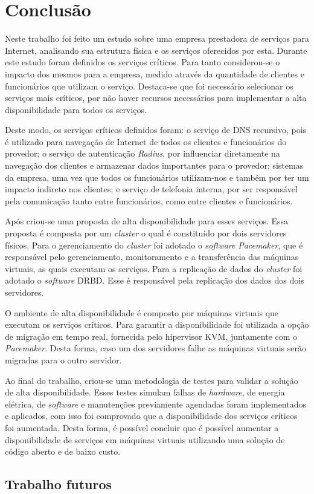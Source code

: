 \chapter{Conclusão}
\label{cap:conclusao}

Neste trabalho foi feito um estudo sobre uma empresa prestadora de serviços para Internet, analisando sua estrutura física e os serviços oferecidos 
por esta. Durante este estudo foram definidos os serviços críticos. Para tanto considerou-se o impacto dos mesmos para a empresa, medido através
da quantidade de clientes e funcionários que utilizam o serviço. Destaca-se que foi necessário selecionar os serviços mais críticos, por não 
haver recursos necessários para implementar a alta disponibilidade para todos os serviços.

Deste modo, os serviços críticos definidos foram: o serviço de \ac{DNS} recursivo, pois é utilizado para navegação de Internet de todos os clientes 
e funcionários do provedor; o serviço de autenticação \textit{Radius}, por influenciar diretamente na navegação dos clientes e armazenar dados 
importantes para o provedor; sistemas da empresa, uma vez que todos os funcionários utilizam-nos e também por ter um impacto indireto nos 
clientes; e serviço de telefonia interna, por ser responsável pela comunicação tanto entre funcionários, como entre clientes e funcionários.

Após criou-se uma proposta de alta disponibilidade para esses serviços. Essa proposta é composta por um \textit{cluster} o qual é constituído 
por dois servidores físicos. Para o gerenciamento do \textit{cluster} foi adotado o \textit{software} \textit{Pacemaker}, que é responsável pelo 
gerenciamento, monitoramento e a transferência das máquinas virtuais, as quais executam os serviços. Para a replicação de dados 
do \textit{cluster} foi adotado o \textit{software} \ac{DRBD}. Esse é responsável pela replicação dos dados dos dois servidores.

O ambiente de alta disponibilidade é composto por máquinas virtuais que executam os serviços críticos. Para garantir a disponibilidade 
foi utilizada a opção de migração em tempo real, fornecida pelo hipervisor \ac{KVM}, juntamente com o \textit{Pacemaker}. Desta forma, 
caso um dos servidores falhe as máquinas virtuais serão migradas para o outro servidor.

Ao final do trabalho, criou-se uma metodologia de testes para validar a solução de alta disponibilidade. Esses testes simulam falhas de 
\textit{hardware}, de energia elétrica, de \textit{software} e manutenções previamente agendadas foram implementados e aplicados, com isso
foi comprovado que a disponibilidade dos serviços críticos foi aumentada.
Desta forma, é possível concluir que é possível aumentar a disponibilidade de serviços em máquinas virtuais utilizando uma solução de
código aberto e de baixo custo.

\newpage

\section{Trabalho futuros}
\label{section:trabalhosfuturos}


